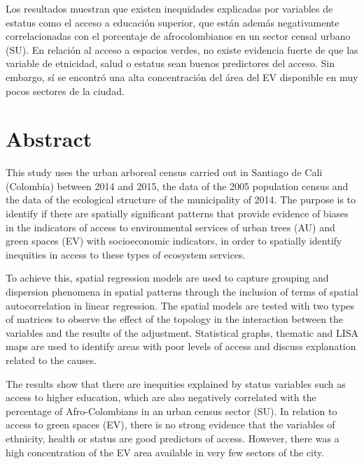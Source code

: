\documentclass[12pt,a4paper,oneside, openany]{book}
\theoremstyle{definition}
\theoremstyle{definition}
\theoremstyle{definition}
\theoremstyle{remark}
\begin{document}
Los resultados muestran que existen inequidades explicadas por variables
de estatus como el acceso a educación superior, que están además
negativamente correlacionadas con el porcentaje de afrocolombianos en un
sector censal urbano (SU). En relación al acceso a espacios verdes, no
existe evidencia fuerte de que las variable de etnicidad, salud o
estatus sean buenos predictores del acceso. Sin embargo, sí se encontró
una alta concentración del área del EV disponible en muy pocos sectores
de la ciudad.

\chapter*{Abstract}\label{abstract}


This study uses the urban arboreal census carried out in Santiago de
Cali (Colombia) between 2014 and 2015, the data of the 2005 population
census and the data of the ecological structure of the municipality of
2014. The purpose is to identify if there are spatially significant
patterns that provide evidence of biases in the indicators of access to
environmental services of urban trees (AU) and green spaces (EV) with
socioeconomic indicators, in order to spatially identify inequities in
access to these types of ecosystem services.

To achieve this, spatial regression models are used to capture grouping
and dispersion phenomena in spatial patterns through the inclusion of
terms of spatial autocorrelation in linear regression. The spatial
models are tested with two types of matrices to observe the effect of
the topology in the interaction between the variables and the results of
the adjustment. Statistical graphs, thematic and LISA maps are used to
identify areas with poor levels of access and discuss explanation
related to the causes.

The results show that there are inequities explained by status variables
such as access to higher education, which are also negatively correlated
with the percentage of Afro-Colombians in an urban census sector (SU).
In relation to access to green spaces (EV), there is no strong evidence
that the variables of ethnicity, health or status are good predictors of
access. However, there was a high concentration of the EV area available
in very few sectors of the city.


\setcounter{tocdepth}{2} \tableofcontents
\end{document}
